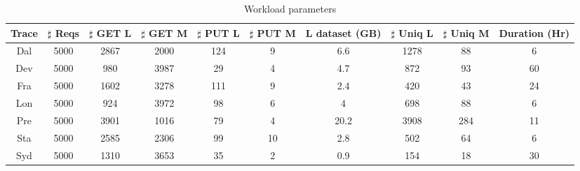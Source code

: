 
\begin{table*}[h!]
	\centering
	{\tiny }
	\caption{Workload parameters}
	\begin{tabular}{| c | c | c | c | c | c | c | c | c |c |} 
		\hline
	Trace    & $\sharp$ Reqs & $\sharp$ GET L & $\sharp$ GET M & $\sharp$ PUT L & $\sharp$ PUT M & L dataset (GB) & $\sharp$ Uniq L & $\sharp$ Uniq M & Duration (Hr)  \\ 
		\hline\hline
		Dal    & 5000 & 2867  & 2000   & 124  & 9    & 6.6    & 1278 & 88  & 6    \\ 
		\hline
		Dev    & 5000 & 980   & 3987   & 29   & 4    & 4.7     & 872 & 93  & 60    \\
		\hline
		Fra     & 5000 & 1602  & 3278   & 111  & 9     & 2.4   & 420 & 43  & 24    \\
		\hline
		Lon    & 5000 & 924    & 3972   & 98  & 6     & 4       & 698 & 88  & 6    \\
		\hline
		Pre    & 5000 & 3901  & 1016   & 79   & 4     & 20.2  & 3908 & 284  & 11    \\  
		\hline
		Sta   & 5000 & 2585 & 2306  & 99   & 10   & 2.8   & 502 & 64  & 6     \\
		\hline 
		Syd      & 5000 & 1310   & 3653   & 35 & 2    & 0.9    & 154 & 18  & 30    \\  
		\hline
	\end{tabular}

\label{tab:eval-overall}
\end{table*}